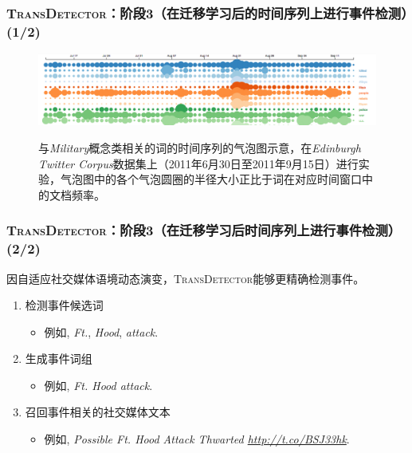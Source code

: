 \begin{frame}
\frametitle{\noindent \textsc{TransDetector}：阶段3（在迁移学习后的时间序列上进行事件检测）(1/2)}	
\begin{figure}[h]
		\setlength{\abovecaptionskip}{0.cm}
        \setlength{\belowcaptionskip}{0.cm}
        \centering
        \caption{与\textit{Military}概念类相关的词的时间序列的气泡图示意，在\textit{Edinburgh Twitter Corpus}数据集上（2011年6月30日至2011年9月15日）进行实验，气泡图中的各个气泡圆圈的半径大小正比于词在对应时间窗口中的文档频率。}
        \includegraphics[width=.99\columnwidth]{img/screenShot.png}
        \label{fig:hood}
\end{figure}
\end{frame}

\begin{frame}
\frametitle{\noindent \textsc{TransDetector}：阶段3（在迁移学习后时间序列上进行事件检测） (2/2)}
因自适应社交媒体语境动态演变，\textsc{TransDetector}能够更精确检测事件。
\begin{enumerate}
	\item 检测事件候选词
	\begin{itemize}
		\item 例如, \textit{Ft.}, \textit{Hood}, \textit{attack}.
	\end{itemize}
	\item 生成事件词组
	\begin{itemize}
		\item 例如, \textit{Ft. Hood attack}.
	\end{itemize}
	\item 召回事件相关的社交媒体文本
	\begin{itemize}
		\item 例如, \textit{Possible Ft. Hood Attack Thwarted \url{http://t.co/BSJ33hk}}.
	\end{itemize}
\end{enumerate}
\end{frame}


